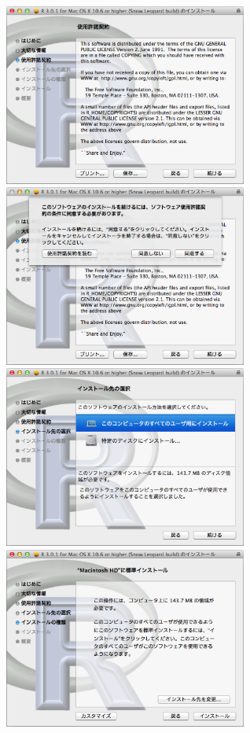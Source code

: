 \documentclass[a4paper,10pt,fleqn]{jarticle}
\begin{document}
\includegraphics[width=8cm]{img/osx/osx004.eps}\hspace{0.8em} \includegraphics[width=8cm]{img/osx/osx005.eps}\\

\includegraphics[width=8cm]{img/osx/osx006.eps}\hspace{0.8em} \includegraphics[width=8cm]{img/osx/osx007.eps}\\
\end{document}

